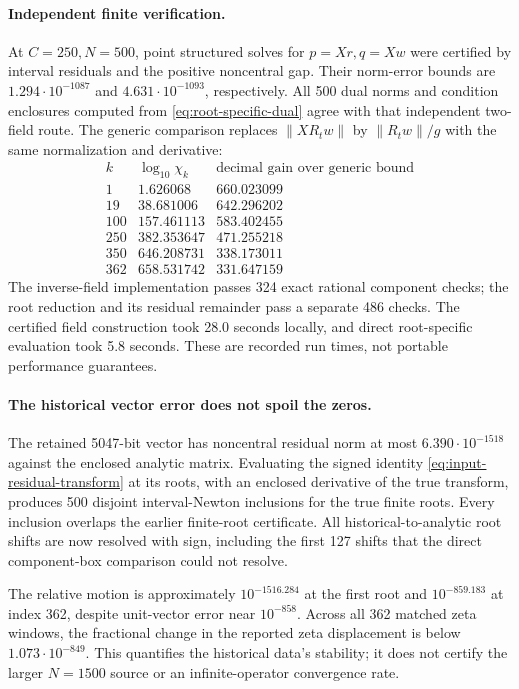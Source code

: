\paragraph{Independent finite verification.}
At $C=250,N=500$, point structured solves for $p=Xr,q=Xw$ were certified
by interval residuals and the positive noncentral gap. Their norm-error
bounds are $1.294\cdot10^{-1087}$ and $4.631\cdot10^{-1093}$,
respectively. All 500 dual norms and condition enclosures computed from
\eqref{eq:root-specific-dual} agree with that independent two-field route.
The generic comparison replaces $\|XR_tw\|$ by $\|R_tw\|/g$ with the
same normalization and derivative:
\[
\begin{array}{r|rr}
k&\log_{10}\chi_k&\text{decimal gain over generic bound}\\
\hline
1&1.626068&660.023099\\
19&38.681006&642.296202\\
100&157.461113&583.402455\\
250&382.353647&471.255218\\
350&646.208731&338.173011\\
362&658.531742&331.647159
\end{array}
\]
The inverse-field implementation passes 324 exact rational component
checks; the root reduction and its residual remainder pass a separate
486 checks. The certified field construction took 28.0 seconds locally,
and direct root-specific evaluation took 5.8 seconds. These are recorded
run times, not portable performance guarantees.

\paragraph{The historical vector error does not spoil the zeros.}
The retained 5047-bit vector has noncentral residual norm at most
$6.390\cdot10^{-1518}$ against the enclosed analytic matrix. Evaluating
the signed identity \eqref{eq:input-residual-transform} at its roots,
with an enclosed derivative of the true transform, produces 500 disjoint
interval-Newton inclusions for the true finite roots. Every inclusion
overlaps the earlier finite-root certificate. All historical-to-analytic
root shifts are now resolved with sign, including the first 127 shifts
that the direct component-box comparison could not resolve.

The relative motion is approximately $10^{-1516.284}$ at the first root
and $10^{-859.183}$ at index 362, despite unit-vector error near
$10^{-858}$. Across all 362 matched zeta windows, the fractional change
in the reported zeta displacement is below $1.073\cdot10^{-849}$.
This quantifies the historical data's stability; it does not certify the
larger $N=1500$ source or an infinite-operator convergence rate.

